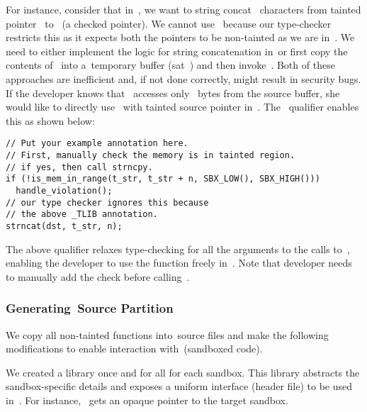For instance, consider that in~\cregion, we want to string concat~ characters from tainted pointer~ to~ (a checked pointer).
We cannot use~ because our type-checker restricts this as it expects both the pointers to be non-tainted as we are in~\cregion.
We need to either implement the logic for string concatenation in~\cregion or first copy the contents of~ into a~\cregion temporary buffer (sat~) and then invoke~.
Both of these approaches are inefficient and, if not done correctly, might result in security bugs.
If the developer knows that~ accesses only~ bytes from the source buffer, she would like to directly use~ with tainted source pointer in~\cregion.
The~ qualifier enables this as shown below:
\begin{verbatim}
// Put your example annotation here.
// First, manually check the memory is in tainted region.
// if yes, then call strncpy.
if (!is_mem_in_range(t_str, t_str + n, SBX_LOW(), SBX_HIGH()))
  handle_violation();
// our type checker ignores this because 
// the above _TLIB annotation.
strncat(dst, t_str, n);
\end{verbatim}
The above qualifier relaxes type-checking for all the arguments to the calls to~, enabling the developer to use the function freely in~\cregion.
Note that developer needs to manually add the check before calling~.

\subsubsection{Generating~\cregion Source Partition}
\label{subsub:gencregion}
We copy all non-tainted functions into~\cregion source files and make the following modifications to enable interaction with~\ucregion (\ie sandboxed code).

We created a library once and for all for each sandbox.
This library abstracts the sandbox-specific details and exposes a uniform interface (header file) to be used in~\cregion.
For instance,~ gets an opaque pointer to the target sandbox.

\iffalse
\noindent\emph{Handling Tainted Buffers in~\cregion}:
All buffers that are marked as tainted in~\cregion should be allocated in the sandbox. For instance,~\code{buff} in function~\code{handle_request} of~\lst{lst:final}.
We perform source rewriting and make the buffer into a pointer variable and allocate the corresponding number of bytes using the sandbox-specific allocator. For instance, we perform the following rewriting for~\code{buff} in~\lst{lst:final} with WASM sandbox.
\begin{verbatim}
- char buff[MAX_MSG_SIZE] __Tainted;
+ char *buff = ....
\end{verbatim}
\aravind{Arun, please fix the above example on how exactly we replace it with WASM allocator.}
Note that we also add the necessary deallocator calls at function exit points.
\fi

